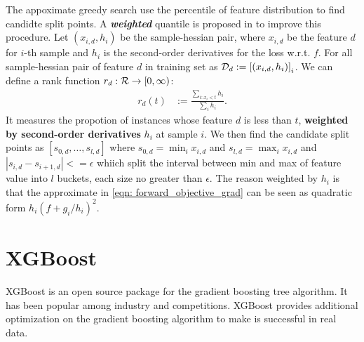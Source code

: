 \documentclass[11pt]{article}
\begin{document}
The appoximate greedy search use the percentile of feature distribution to find candidte split points. A \emph{\textbf{weighted}} quantile is proposed in \citep{chen2016xgboost} to improve this procedure. Let $(x_{i,d}, h_{i})$ be the sample-hessian pair, where $x_{i,d}$ be the feature $d$ for $i$-th sample and $h_{i}$ is the second-order derivatives for the loss w.r.t. $f$. For all sample-hessian pair of feature $d$ in training set as ${\mathcal D}_{d} := \left[(x_{i,d}, h_{i})\right]_{i}$. We can define a rank function $r_{d}: {\mathcal R} \rightarrow [0,\infty)$:
\begin{align*}
r_{d}(t) &:= \frac{\sum_{i: x_i < t}h_{i}}{\sum_{i}h_{i}}.
\end{align*} It measures the propotion of instances whose feature $d$ is less than $t$, \textbf{weighted by second-order derivatives} $h_{i}$ at sample $i$. We then find the candidate split points as $[s_{0,d}, \ldots, s_{l,d}]$ where $s_{0,d} = \min_{i}x_{i,d}$ and $s_{l,d} = \max_{i}x_{i,d}$ and $|s_{i,d} - s_{i+1,d}| <= \epsilon$ whiich split the interval between min and max of feature value into $l$ buckets, each size no greater than $\epsilon$. The reason weighted by $h_{i}$ is that the approximate in \eqref{eqn: forward_objective_grad} can be seen as quadratic form $h_{i}(f + g_{i}/h_{i})^2$.  

\section{XGBoost}
XGBoost \citep{chen2016xgboost} is an open source package for the gradient boosting tree algorithm. It has been popular among industry and competitions. XGBoost provides additional optimization on the gradient boosting algorithm to make is successful in real data.
\end{document}
